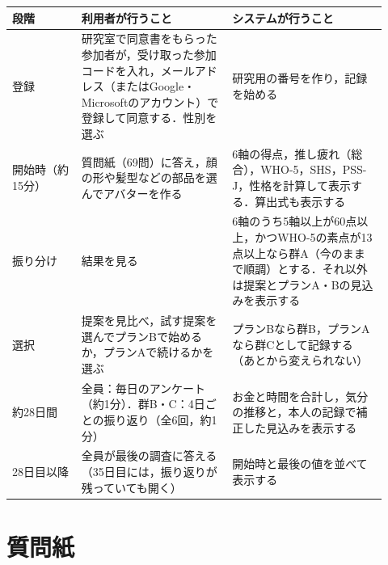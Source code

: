 \begin{table}[t]
\centering
{}
\label{tab:flow}
\small
\begin{tabular}{@{}p{0.17\linewidth}p{0.37\linewidth}p{0.38\linewidth}@{}}
\toprule
段階 & 利用者が行うこと & システムが行うこと \\
\midrule
登録 & 研究室で同意書をもらった参加者が，受け取った参加コードを入れ，メールアドレス（またはGoogle・Microsoftのアカウント）で登録して同意する．性別を選ぶ & 研究用の番号を作り，記録を始める \\
開始時（約15分） & 質問紙（69問）に答え，顔の形や髪型などの部品を選んでアバターを作る & 6軸の得点，推し疲れ（総合），WHO-5，SHS，PSS-J，性格を計算して表示する．算出式も表示する \\
振り分け & 結果を見る & 6軸のうち5軸以上が60点以上，かつWHO-5の素点が13点以上なら群A（今のままで順調）とする．それ以外は提案とプランA・Bの見込みを表示する \\
選択 & 提案を見比べ，試す提案を選んでプランBで始めるか，プランAで続けるかを選ぶ & プランBなら群B，プランAなら群Cとして記録する（あとから変えられない） \\
約28日間 & 全員：毎日のアンケート（約1分）．群B・C：4日ごとの振り返り（全6回，約1分） & お金と時間を合計し，気分の推移と，本人の記録で補正した見込みを表示する \\
28日目以降 & 全員が最後の調査に答える（35日目には，振り返りが残っていても開く） & 開始時と最後の値を並べて表示する \\
\bottomrule
\end{tabular}
\end{table}

\section{質問紙}
